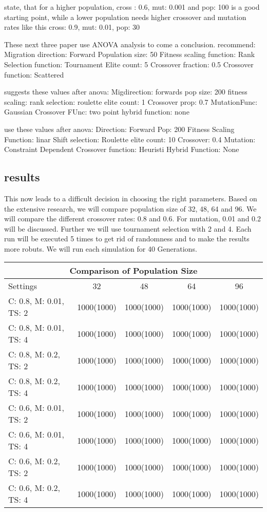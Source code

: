 \cite{srinivas_genetic_1994} state, that for a higher population, cross : 0.6, mut: 0.001 and pop: 100 is a good starting point, while a lower population needs higher crossover and mutation rates like this cross: 0.9, mut: 0.01, pop: 30

These next three paper use ANOVA analysis to come a conclusion. \cite{fazal_estimating_2005} recommend:
Migration direction: Forward
Population size: 50 
Fitness scaling function: Rank
Selection function: Tournament
Elite count: 5
Crossover fraction: 0.5
Crossover function: Scattered


\cite{dao_maximising_2016} suggests these values after anova:
Migdirection: forwards
pop size: 200
fitness scaling: rank
selection: roulette
elite count: 1
Crossover prop: 0.7
MutationFunc: Gaussian
Crossover FUnc: two point
hybrid function: none


\cite{assistant_professor_amity_university_jaipur_rajasthan_india_parameter_2019} use these values after anova:
Direction: Forward
Pop: 200 
Fitness Scaling Function: linar Shift
selection: Roulette 
elite count: 10 
Crossover: 0.4 
Mutation: Constraint Dependent 
Crossover function: Heuristi
Hybrid Function: None




\subsection{results}
This now leads to a difficult decision in choosing the right parameters. Based on the extensive research, we will compare population size of 32, 48, 64 and 96. We will compare the different crossover rates: 0.8 and 0.6. For mutation, 0.01 and 0.2 will be discussed. Further we will use tournament selection with 2 and 4.
Each run will be executed 5 times to get rid of randomness and to make the results more robuts. We will run each simulation for 40 Generations.


\begin{tabular}{ |l||c|c|c|c|  }
	\hline
	\multicolumn{5}{|c|}{ Comparison of Population Size} \\
	\hline
	Settings & 32 & 48 & 64 & 96\\
	\hline
	C: 0.8, M: 0.01, TS: 2   	& 1000(1000) & 1000(1000) & 1000(1000) & 1000(1000)\\
	C: 0.8, M: 0.01, TS: 4		& 1000(1000) & 1000(1000) & 1000(1000) & 1000(1000)\\
	C: 0.8, M: 0.2, TS: 2 		& 1000(1000) & 1000(1000) & 1000(1000) & 1000(1000)\\
	C: 0.8, M: 0.2, TS: 4    	& 1000(1000) & 1000(1000) & 1000(1000) & 1000(1000)\\
	C: 0.6, M: 0.01, TS: 2   	& 1000(1000) & 1000(1000) & 1000(1000) & 1000(1000)\\
	C: 0.6, M: 0.01, TS: 4		& 1000(1000) & 1000(1000) & 1000(1000) & 1000(1000)\\
	C: 0.6, M: 0.2, TS: 2 		& 1000(1000) & 1000(1000) & 1000(1000) & 1000(1000)\\
	C: 0.6, M: 0.2, TS: 4    	& 1000(1000) & 1000(1000) & 1000(1000) & 1000(1000)\\
	\hline
\end{tabular}

